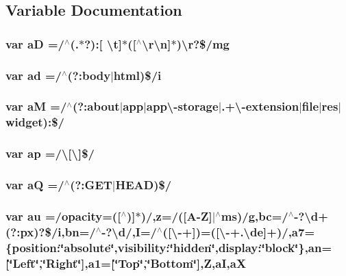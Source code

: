 \subsection{Variable Documentation}
\subsubsection[{a\-D}]{\setlength{\rightskip}{0pt plus 5cm}var a\-D =/$^\wedge$(.$\ast$?)\-:[ \textbackslash{}t]$\ast$([$^\wedge$\textbackslash{}r\textbackslash{}n]$\ast$)\textbackslash{}r?\$/mg}\label{jquery_8js_ad223f5fba68c41c1236671ac5c5b0fcb}
\subsubsection[{ad}]{\setlength{\rightskip}{0pt plus 5cm}var ad =/$^\wedge$(?\-:body$\vert$html)\$/i}\label{jquery_8js_a96709ee617c39629621377849b5e0a7f}
\subsubsection[{a\-M}]{\setlength{\rightskip}{0pt plus 5cm}var a\-M =/$^\wedge$(?\-:about$\vert$app$\vert$app\textbackslash{}-\/storage$\vert$.+\textbackslash{}-\/extension$\vert$file$\vert$res$\vert$widget)\-:\$/}\label{jquery_8js_a8cc6111a5def3ea889157d13fb9a9672}
\subsubsection[{ap}]{\setlength{\rightskip}{0pt plus 5cm}var ap =/\textbackslash{}[\textbackslash{}]\$/}\label{jquery_8js_a6ddf393cc7f9a8828e197bb0d9916c44}
\subsubsection[{a\-Q}]{\setlength{\rightskip}{0pt plus 5cm}var a\-Q =/$^\wedge$(?\-:G\-E\-T$\vert$H\-E\-A\-D)\$/}\label{jquery_8js_a79eb58dc6cdf0aef563d5dc1ded27df5}
\subsubsection[{au}]{\setlength{\rightskip}{0pt plus 5cm}var au =/opacity=([$^\wedge$)]$\ast$)/,z=/([A-\/{\bf Z}]$\vert$$^\wedge$ms)/g,bc=/$^\wedge$-\/?\textbackslash{}d+(?\-:px)?\$/i,bn=/$^\wedge$-\/?\textbackslash{}d/,I=/$^\wedge$([\textbackslash{}-\/+])=([\textbackslash{}-\/+.\textbackslash{}de]+)/,a7=\{position\-:\char`\"{}absolute\char`\"{},visibility\-:\char`\"{}hidden\char`\"{},display\-:\char`\"{}block\char`\"{}\},an=[\char`\"{}Left\char`\"{},\char`\"{}Right\char`\"{}],a1=[\char`\"{}Top\char`\"{},\char`\"{}Bottom\char`\"{}],Z,a\-I,a\-X}\label{jquery_8js_a4fd8ddfab07c8d7c7cae0ab0e052cad3}

